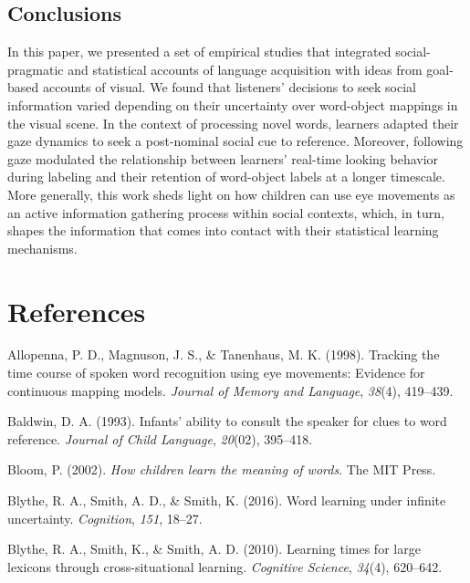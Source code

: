 \documentclass[man,floatsintext]{apa6}
\begin{document}
\subsection{Conclusions}\label{conclusions}

In this paper, we presented a set of empirical studies that integrated
social-pragmatic and statistical accounts of language acquisition with
ideas from goal-based accounts of visual. We found that listeners'
decisions to seek social information varied depending on their
uncertainty over word-object mappings in the visual scene. In the
context of processing novel words, learners adapted their gaze dynamics
to seek a post-nominal social cue to reference. Moreover, following gaze
modulated the relationship between learners' real-time looking behavior
during labeling and their retention of word-object labels at a longer
timescale. More generally, this work sheds light on how children can use
eye movements as an active information gathering process within social
contexts, which, in turn, shapes the information that comes into contact
with their statistical learning mechanisms.

\newpage

\section{References}\label{references}

\begingroup
\setlength{\parindent}{-0.5in} \setlength{\leftskip}{0.5in}

\hypertarget{refs}{}
\hypertarget{ref-allopenna1998tracking}{}
Allopenna, P. D., Magnuson, J. S., \& Tanenhaus, M. K. (1998). Tracking
the time course of spoken word recognition using eye movements: Evidence
for continuous mapping models. \emph{Journal of Memory and Language},
\emph{38}(4), 419--439.

\hypertarget{ref-baldwin1993infants}{}
Baldwin, D. A. (1993). Infants' ability to consult the speaker for clues
to word reference. \emph{Journal of Child Language}, \emph{20}(02),
395--418.

\hypertarget{ref-bloom2002children}{}
Bloom, P. (2002). \emph{How children learn the meaning of words}. The
MIT Press.

\hypertarget{ref-blythe2016word}{}
Blythe, R. A., Smith, A. D., \& Smith, K. (2016). Word learning under
infinite uncertainty. \emph{Cognition}, \emph{151}, 18--27.

\hypertarget{ref-blythe2010learning}{}
Blythe, R. A., Smith, K., \& Smith, A. D. (2010). Learning times for
large lexicons through cross-situational learning. \emph{Cognitive
Science}, \emph{34}(4), 620--642.
\end{document}
